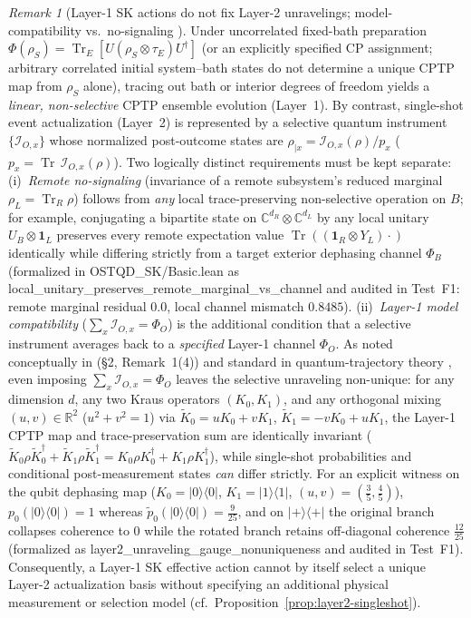 \documentclass[11pt,a4paper]{article}
\theoremstyle{definition}
\theoremstyle{remark}
\newtheorem{remark}{Remark}
\newcommand{\Tr}{\operatorname{Tr}}
\newcommand{\cI}{\mathcal{I}}
\newcommand{\bbC}{\mathbb{C}}
\newcommand{\bbR}{\mathbb{R}}
\newcommand{\1}{\mathbf{1}}
\newcommand{\code}[1]{{\scriptsize\ttfamily #1}}
\begin{document}
\begin{remark}[Layer-1 SK actions do not fix Layer-2 unravelings; model-compatibility vs.\ no-signaling \cite{WisemanDiosi2001,Soga2026OSTQD}]\label{rem:layer2-gauge}
Under uncorrelated fixed-bath preparation $\Phi(\rho_S)=\Tr_E[U(\rho_S\otimes\tau_E)U^\dagger]$ (or an explicitly specified CP assignment; arbitrary correlated initial system--bath states do not determine a unique CPTP map from $\rho_S$ alone), tracing out bath or interior degrees of freedom yields a \emph{linear, non-selective} CPTP ensemble evolution (Layer~1). By contrast, single-shot event actualization (Layer~2) is represented by a selective quantum instrument $\{\cI_{O,x}\}$ whose normalized post-outcome states are $\rho_{|x}=\cI_{O,x}(\rho)/p_x$ ($p_x=\Tr\,\cI_{O,x}(\rho)$). Two logically distinct requirements must be kept separate:
(i)~\emph{Remote no-signaling} \cite{Gisin1990} (invariance of a remote subsystem's reduced marginal $\rho_L = \Tr_R \rho$) follows from \emph{any} local trace-preserving non-selective operation on $B$; for example, conjugating a bipartite state on $\bbC^{d_R}\otimes\bbC^{d_L}$ by any local unitary $U_B\otimes\1_L$ preserves every remote expectation value $\Tr((\1_R\otimes Y_L)\cdot)$ identically while differing strictly from a target exterior dephasing channel $\Phi_B$ (formalized in \code{OSTQD\_\allowbreak SK/\allowbreak Basic.lean} as \code{local\_\allowbreak unitary\_\allowbreak preserves\_\allowbreak remote\_\allowbreak marginal\_\allowbreak vs\_\allowbreak channel} and audited in Test~F1: remote marginal residual $0.0$, local channel mismatch $0.8485$).
(ii)~\emph{Layer-1 model compatibility} ($\sum_x \cI_{O,x} = \Phi_O$) is the additional condition that a selective instrument averages back to a \emph{specified} Layer-1 channel $\Phi_O$.
As noted conceptually in \cite{Soga2026OSTQD} (\S2, Remark~1(4)) and standard in quantum-trajectory theory \cite{WisemanDiosi2001}, even imposing $\sum_x \cI_{O,x}=\Phi_O$ leaves the selective unraveling non-unique: for any dimension $d$, any two Kraus operators $(K_0,K_1)$, and any orthogonal mixing $(u,v)\in\bbR^2$ ($u^2+v^2=1$) via $\tilde{K}_0 = u K_0 + v K_1$, $\tilde{K}_1 = -v K_0 + u K_1$, the Layer-1 CPTP map and trace-preservation sum are identically invariant ($\tilde{K}_0\rho\tilde{K}_0^\dagger + \tilde{K}_1\rho\tilde{K}_1^\dagger = K_0\rho K_0^\dagger + K_1\rho K_1^\dagger$), while single-shot probabilities and conditional post-measurement states \emph{can} differ strictly. For an explicit witness on the qubit dephasing map ($K_0=|0\rangle\langle 0|$, $K_1=|1\rangle\langle 1|$, $(u,v)=(\frac{3}{5},\frac{4}{5})$), $p_0(|0\rangle\langle 0|)=1$ whereas $\tilde{p}_0(|0\rangle\langle 0|)=\frac{9}{25}$, and on $|+\rangle\langle +|$ the original branch collapses coherence to $0$ while the rotated branch retains off-diagonal coherence $\frac{12}{25}$ (formalized as \code{layer2\_\allowbreak unraveling\_\allowbreak gauge\_\allowbreak nonuniqueness} and audited in Test~F1). Consequently, a Layer-1 SK effective action cannot by itself select a unique Layer-2 actualization basis without specifying an additional physical measurement or selection model (cf.\ Proposition~\ref{prop:layer2-singleshot}).
\end{remark}
\end{document}
